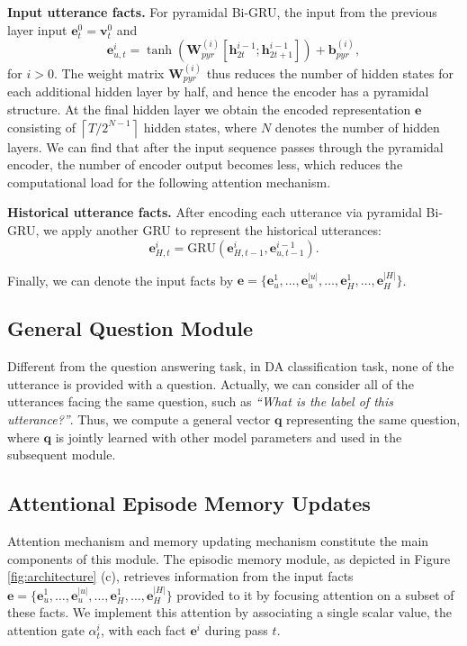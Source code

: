 \documentclass[conference]{IEEEtran}
\begin{document}
	\noindent\textbf{Input utterance facts. }For pyramidal Bi-GRU, the input from the previous layer input $\mathbf{e}_t^0 = \mathbf{v}_t^0$ and
	\begin{equation}
	\mathbf{e}_{u,t}^i = \tanh(\mathbf{W}_{pyr}^{(i)}[\mathbf{h}_{2t}^{i-1}; \mathbf{h}_{2t+1}^{i-1}]) + \mathbf{b}_{pyr}^{(i)},
	\end{equation}
	for $i >0$. The weight matrix $\mathbf{W}_{pyr}^{(i)}$ thus reduces the number of hidden states for each additional hidden layer by half, and hence the encoder has a pyramidal structure. At the final hidden layer we obtain the encoded representation $\mathbf{e}$ consisting of $\left \lceil T/2^{N-1} \right \rceil$ hidden states, where $N$ denotes the number of hidden layers. We can find that after the input sequence passes through the pyramidal encoder, the number of encoder output becomes less, which reduces the computational load for the following attention mechanism. 
	
	\noindent\textbf{Historical utterance facts. }After encoding each utterance via pyramidal  Bi-GRU, we apply another GRU to represent the historical utterances:
	\begin{equation}
	\mathbf{e}_{H,t}^{i}= \text{GRU}(\mathbf{e}_{H,t-1}^i, \mathbf{e}_{u,t-1}^{i-1}).
	\end{equation}
	
	Finally, we can denote the input facts by $\mathbf{e}=\{\mathbf{e}_{u}^1, \ldots, \mathbf{e}_{u}^{|u|}, \ldots,\mathbf{e}_{H}^1, \ldots, \mathbf{e}_{H}^{|H|}\}$.
	
	\subsection{General Question Module}\label{subsec_question}
	Different from the question answering task, in DA classification task, none of the utterance is provided with a question. Actually, we can consider all of the utterances facing the same question, such as \emph{``What is the label of this utterance?''}. Thus, we compute a general vector $\mathbf{q}$ representing the same question, where $\mathbf{q}$ is jointly learned with other model parameters and used in the subsequent module.
	
	\subsection{Attentional Episode Memory Updates}\label{subsec_memory}
	Attention mechanism and memory updating mechanism constitute the main components of this module. The episodic memory module, as depicted in Figure \ref{fig:architecture} (c), retrieves information from the input facts $\mathbf{e}=\{\mathbf{e}_{u}^1, \ldots, \mathbf{e}_{u}^{|u|}, \ldots,\mathbf{e}_{H}^1, \ldots, \mathbf{e}_{H}^{|H|}\}$ provided to it by focusing attention on a subset of these facts. We implement this attention by associating a single scalar value, the attention gate $\alpha_t^i$, with each fact $\mathbf{e}^i$ during pass $t$.
	
\end{document}
